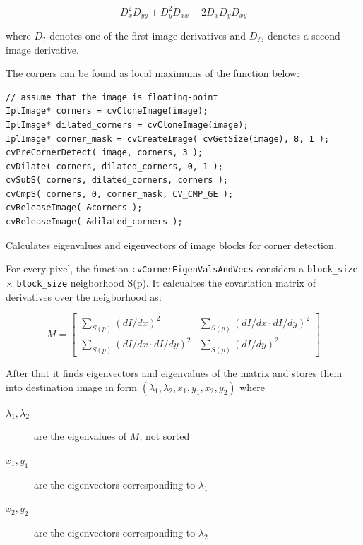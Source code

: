 \[
D_x^2 D_{yy} + D_y^2 D_{xx} - 2 D_x D_y D_{xy}
\]

where $D_?$ denotes one of the first image derivatives and $D_{??}$ denotes a second image derivative.

The corners can be found as local maximums of the function below:

\begin{lstlisting}
// assume that the image is floating-point
IplImage* corners = cvCloneImage(image);
IplImage* dilated_corners = cvCloneImage(image);
IplImage* corner_mask = cvCreateImage( cvGetSize(image), 8, 1 );
cvPreCornerDetect( image, corners, 3 );
cvDilate( corners, dilated_corners, 0, 1 );
cvSubS( corners, dilated_corners, corners );
cvCmpS( corners, 0, corner_mask, CV_CMP_GE );
cvReleaseImage( &corners );
cvReleaseImage( &dilated_corners );
\end{lstlisting}

\label{CornerEigenValsAndVecs}
Calculates eigenvalues and eigenvectors of image blocks for corner detection.


\begin{description}
\end{description}

For every pixel, the function \texttt{cvCornerEigenValsAndVecs} considers a \texttt{block\_size} $\times$ \texttt{block\_size} neigborhood S(p). It calcualtes the covariation matrix of derivatives over the neigborhood as:

\[
M = \begin{bmatrix}
\sum_{S(p)}(dI/dx)^2 & \sum_{S(p)}(dI/dx \cdot dI/dy)^2 \\
\sum_{S(p)}(dI/dx \cdot dI/dy)^2 & \sum_{S(p)}(dI/dy)^2
\end{bmatrix}
\]

After that it finds eigenvectors and eigenvalues of the matrix and stores them into destination image in form
$(\lambda_1, \lambda_2, x_1, y_1, x_2, y_2)$ where
\begin{description}
\item[$\lambda_1, \lambda_2$]are the eigenvalues of $M$; not sorted
\item[$x_1, y_1$]are the eigenvectors corresponding to $\lambda_1$
\item[$x_2, y_2$]are the eigenvectors corresponding to $\lambda_2$
\end{description}

